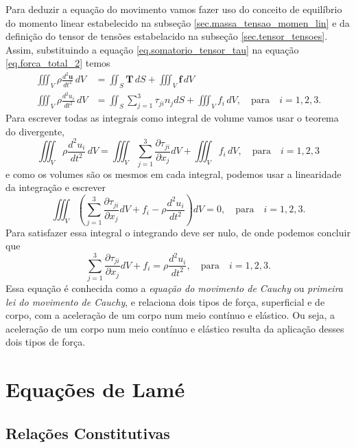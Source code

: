 Para deduzir a equa\c{c}\~ao do movimento vamos fazer uso do conceito de equil\'ibrio do momento linear estabelecido na subse\c{c}\~ao \ref{sec.massa_tensao_momen_lin} e da defini\c{c}\~ao do tensor de tens\~oes estabelacido na subse\c{c}\~ao \ref{sec.tensor_tensoes}. Assim, substituindo a equa\c{c}\~ao \ref{eq.somatorio_tensor_tau} na equa\c{c}\~ao \ref{eq.forca_total_2} temos
\begin{align*}
\iiint_V\rho\frac{d^2\mathbf{u}}{dt^2}\,dV&=\iint_S\mathbf{T}\,dS+\iiint_V\mathbf{f}\,dV\\
\iiint_V\rho\frac{d^2u_i}{dt^2}\,dV&=\iint_S\sum_{j=1}^3\tau_{ji}n_jdS+\iiint_Vf_i\,dV,\quad \text{para}\quad i=1,2,3.
\end{align*}
Para escrever todas as integrais como integral de volume vamos usar o teorema do divergente,
\begin{equation}\label{eq.movi_cauchy_integral}
\iiint_V\rho\frac{d^2u_i}{dt^2}\,dV=\iiint_V\sum_{j=1}^3\frac{\partial\tau_{ji}}{\partial x_j}dV+\iiint_Vf_i\,dV,\quad \text{para}\quad i=1,2,3
\end{equation}
e como os volumes s\~ao os mesmos em cada integral, podemos usar a linearidade da integra\c{c}\~ao e escrever
\begin{equation}
\iiint_V\left(\sum_{j=1}^3\frac{\partial\tau_{ji}}{\partial x_j}dV+f_i-\rho\frac{d^2u_i}{dt^2}\right)dV=0,\quad \text{para}\quad i=1,2,3.
\end{equation}
Para satisfazer essa integral o integrando deve ser nulo, de onde podemos concluir que
\begin{equation}
\sum_{j=1}^3\frac{\partial\tau_{ji}}{\partial x_j}dV+f_i=\rho\frac{d^2u_i}{dt^2},\quad \text{para}\quad i=1,2,3.
\end{equation}
Essa equa\c{c}\~ao \'e conhecida como a \textit{equa\c{c}\~ao do movimento de Cauchy} ou \textit{primeira lei do movimento de Cauchy}, e relaciona dois tipos de for\c{c}a, superficial e de corpo, com a acelera\c{c}\~ao de um corpo num meio cont\'inuo e el\'astico. Ou seja, a acelera\c{c}\~ao de um corpo num meio cont\'inuo e el\'astico resulta da aplica\c{c}\~ao desses dois tipos de for\c{c}a.

  
\section{Equações de Lamé}
\subsection{Rela\c{c}\~oes Constitutivas}

